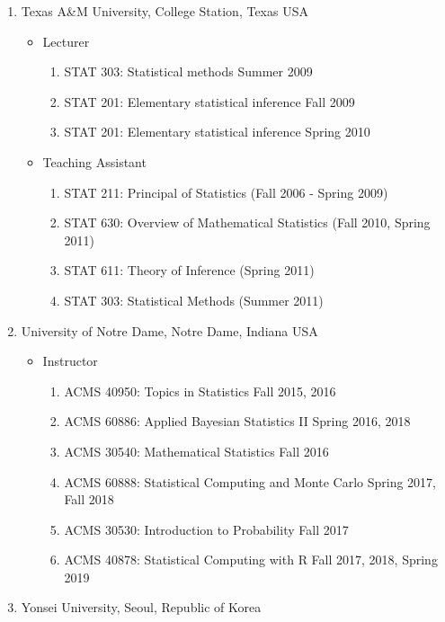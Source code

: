 \documentclass[
]{book}
\providecommand{\tightlist}{%
  \setlength{\itemsep}{0pt}\setlength{\parskip}{0pt}}
\begin{document}
\begin{enumerate}
\def\labelenumi{\arabic{enumi}.}
\item
  Texas A\&M University, College Station, Texas USA

  \begin{itemize}
  \item
    Lecturer

    \begin{enumerate}
    \def\labelenumii{\arabic{enumii}.}
    \tightlist
    \item
      STAT 303: Statistical methods Summer 2009
    \item
      STAT 201: Elementary statistical inference Fall 2009
    \item
      STAT 201: Elementary statistical inference Spring 2010
    \end{enumerate}
  \item
    Teaching Assistant

    \begin{enumerate}
    \def\labelenumii{\arabic{enumii}.}
    \tightlist
    \item
      STAT 211: Principal of Statistics (Fall 2006 - Spring 2009)
    \item
      STAT 630: Overview of Mathematical Statistics (Fall 2010, Spring 2011)
    \item
      STAT 611: Theory of Inference (Spring 2011)
    \item
      STAT 303: Statistical Methods (Summer 2011)
    \end{enumerate}
  \end{itemize}
\item
  University of Notre Dame, Notre Dame, Indiana USA

  \begin{itemize}
  \tightlist
  \item
    Instructor

    \begin{enumerate}
    \def\labelenumii{\arabic{enumii}.}
    \tightlist
    \item
      ACMS 40950: Topics in Statistics Fall 2015, 2016
    \item
      ACMS 60886: Applied Bayesian Statistics II Spring 2016, 2018
    \item
      ACMS 30540: Mathematical Statistics Fall 2016
    \item
      ACMS 60888: Statistical Computing and Monte Carlo Spring 2017, Fall 2018
    \item
      ACMS 30530: Introduction to Probability Fall 2017
    \item
      ACMS 40878: Statistical Computing with R Fall 2017, 2018, Spring 2019
    \end{enumerate}
  \end{itemize}
\item
  Yonsei University, Seoul, Republic of Korea


\end{enumerate}
\end{document}
